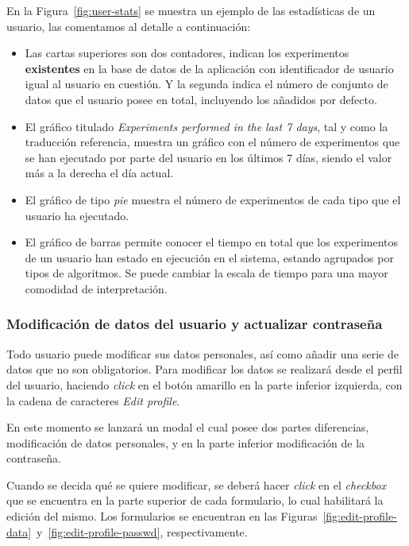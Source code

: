 En la Figura~\ref{fig:user-stats} se muestra un ejemplo de las estadísticas de un usuario, las comentamos al detalle a continuación:
\begin{itemize}
\item Las cartas superiores son dos contadores, indican los experimentos \textbf{existentes} en la base de datos de la aplicación con identificador de usuario igual al usuario en cuestión. Y la segunda indica el número de conjunto de datos que el usuario posee en total, incluyendo los añadidos por defecto.
\item El gráfico titulado \textit{Experiments performed in the last 7 days}, tal y como la traducción referencia, muestra un gráfico con el número de experimentos que se han ejecutado por parte del usuario en los últimos 7 días, siendo el valor más a la derecha el día actual.
\item El gráfico de tipo \textit{pie} muestra el número de experimentos de cada tipo que el usuario ha ejecutado.
\item El gráfico de barras permite conocer el tiempo en total que los experimentos de un usuario han estado en ejecución en el sistema, estando agrupados por tipos de algoritmos. Se puede cambiar la escala de tiempo para una mayor comodidad de interpretación.
\end{itemize}


\subsubsection{Modificación de datos del usuario y actualizar contraseña}
Todo usuario puede modificar sus datos personales, así como añadir una serie de datos que no son obligatorios. Para modificar los datos se realizará desde el perfil del usuario, haciendo \textit{click} en el botón amarillo en la parte inferior izquierda, con la cadena de caracteres \textit{Edit profile}.

En este momento se lanzará un modal el cual posee dos partes diferencias, modificación de datos personales, y en la parte inferior modificación de la contraseña.

Cuando se decida qué se quiere modificar, se deberá hacer \textit{click} en el \textit{checkbox} que se encuentra en la parte superior de cada formulario, lo cual habilitará la edición del mismo. Los formularios se encuentran en las Figuras~\ref{fig:edit-profile-data}~y~\ref{fig:edit-profile-passwd}, respectivamente. 

